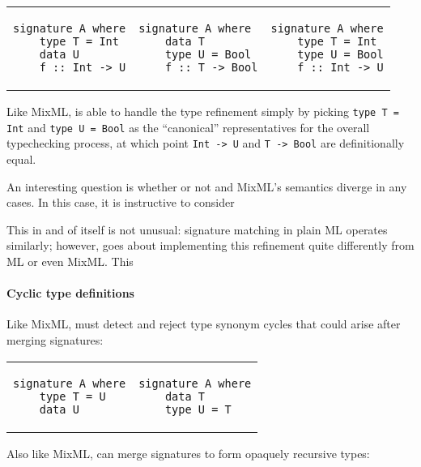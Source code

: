 \begin{tabular}{p{} p{} p{}}
\begin{verbatim}
signature A where
    type T = Int
    data U
    f :: Int -> U
\end{verbatim}
&
\begin{verbatim}
signature A where
    data T
    type U = Bool
    f :: T -> Bool
\end{verbatim}
&
\begin{verbatim}
signature A where
    type T = Int
    type U = Bool
    f :: Int -> U
\end{verbatim}
\end{tabular}

\noindent
Like MixML, \Backpack{} is able to handle the type refinement simply
by picking \verb|type T = Int| and \verb|type U = Bool| as the ``canonical''
representatives for the overall typechecking process, at which point
\verb|Int -> U| and \verb|T -> Bool| are definitionally equal.

An interesting question is whether or not \Backpack{} and MixML's semantics
diverge in any cases.  In this case, it is instructive to consider



This in and of itself
is not unusual: signature matching in plain ML operates similarly;
however, \Backpack{} goes about implementing this refinement quite differently
from ML or even MixML\@.  This 


\paragraph{Cyclic type definitions}

Like MixML, \Backpack{} must detect and reject type synonym cycles that
could arise after merging signatures:

\begin{tabular}{p{} p{}}
\begin{verbatim}
signature A where
    type T = U
    data U
\end{verbatim}
&
\begin{verbatim}
signature A where
    data T
    type U = T
\end{verbatim}
\end{tabular}

Also like MixML, \Backpack{} can merge signatures to form opaquely recursive types:

